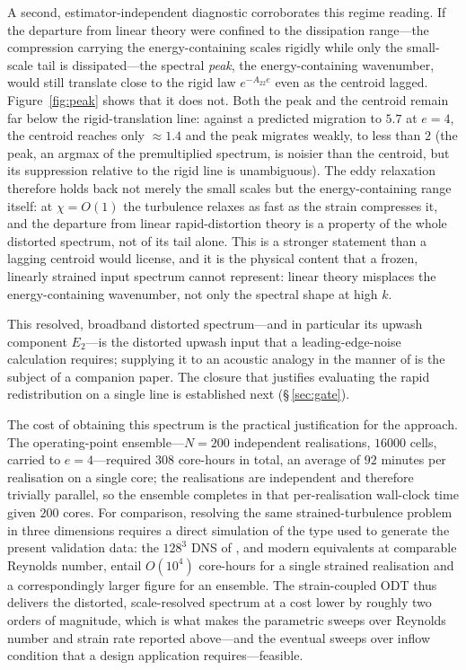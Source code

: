 \documentclass[lineno]{JFM-FLM_Au}
\begin{document}
A second, estimator-independent diagnostic corroborates this regime reading.
If the departure from linear theory were confined to the dissipation range---the
compression carrying the energy-containing scales rigidly while only the
small-scale tail is dissipated---the spectral \emph{peak}, the energy-containing
wavenumber, would still translate close to the rigid law $e^{-A_{22}e}$ even as
the centroid lagged. Figure~\ref{fig:peak} shows that it does not.
Both the peak and the centroid remain far below the rigid-translation line:
against a predicted migration to $5.7$ at $e=4$, the centroid reaches only
$\approx1.4$ and the peak migrates weakly, to less than $2$ (the peak, an argmax
of the premultiplied spectrum, is noisier than the centroid, but its suppression
relative to the rigid line is unambiguous). The eddy relaxation therefore holds
back not merely the small scales but the energy-containing range itself: at
$\chi=O(1)$ the turbulence relaxes as fast as the strain compresses it, and the
departure from linear rapid-distortion theory is a property of the whole
distorted spectrum, not of its tail alone. This is a stronger statement than a
lagging centroid would license, and it is the physical content that a frozen,
linearly strained input spectrum cannot represent: linear theory misplaces the
energy-containing wavenumber, not only the spectral shape at high $k$.

This resolved, broadband distorted spectrum---and in particular its upwash component $E_2$---is the distorted upwash input that a leading-edge-noise calculation requires; supplying it to an acoustic analogy in the manner of \citet{Amiet1975} is the subject of a companion paper. The closure that justifies evaluating the rapid redistribution on a single line is established next (\S\,\ref{sec:gate}).

The cost of obtaining this spectrum is the practical justification for the
approach. The operating-point ensemble---$N=200$ independent realisations,
$16000$ cells, carried to $e=4$---required $308$ core-hours in total, an average
of $92$ minutes per realisation on a single core; the realisations are
independent and therefore trivially parallel, so the ensemble completes in that
per-realisation wall-clock time given $200$ cores. For comparison, resolving the
same strained-turbulence problem in three dimensions requires a direct
simulation of the type used to generate the present validation data: the $128^3$
DNS of \citet{LeeReynolds1985}, and modern equivalents at comparable Reynolds
number, entail $O(10^4)$ core-hours for a single strained realisation and a
correspondingly larger figure for an ensemble. The strain-coupled ODT thus
delivers the distorted, scale-resolved spectrum at a cost lower by roughly two
orders of magnitude, which is what makes the parametric sweeps over Reynolds
number and strain rate reported above---and the eventual sweeps over inflow
condition that a design application requires---feasible.
\end{document}
